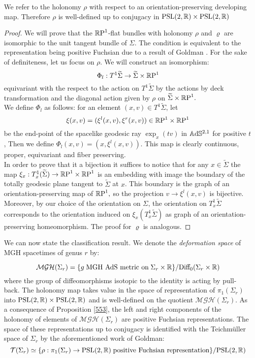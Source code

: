 \begin{observation}
We refer to the holonomy $\rho$ with respect to an orientation-preserving developing map. Therefore $\rho$ is well-defined up to conjugacy in $\text{PSL}(2,\R)\times\text{PSL}(2,\R)$
\end{observation}
\begin{proof}
    We will prove that the $\S$-flat bundles with holonomy $\rho$ and $\varrho$ are isomorphic to the unit tangent bundle of $\Sigma.$ The condition is equivalent to the representation being positive Fuchsian due to a result of Goldman \cite{goldman1980discontinuous}. For the sake of definiteness, let us focus on $\rho$. We will construct an isomorphism: 
    \[
        \Phi_l:T^1\widetilde{\Sigma}\to \widetilde{\Sigma}\times\S
    \]
    equivariant with the respect to the action on $T^1\widetilde{\Sigma}$ by the actions by deck transformation and the diagonal action given by $\rho$ on $\widetilde{\Sigma}\times\S.$ \\
    We define $\Phi_l$ as follows: for an element $(x,v)\in T^1\widetilde{\Sigma}$, let 
    \[
        \xi(x,v)=(\xi^l(x,v),\xi^r(x,v))\in \T
    \]
    be the end-point of the spacelike geodesic ray $\exp_x(tv)$ in $\A^{2,1}$ for positive $t$, Then we define $\Phi_l(x,v)=(x,\xi^l(x,v)).$ This map is clearly continuous, proper, equivariant and fiber preserving. \\
    In order to prove that it a bijection it suffices to notice that for any $x\in\widetilde{\Sigma}$ the map $\xi_x:T_x^1(\widetilde{\Sigma})\to\T$ is an embedding with image the boundary of the totally geodesic plane tangent to $\widetilde{\Sigma}$ at $x$. This boundary is the graph of an orientation-preserving map of $\S,$ so the projection $v\to\xi^l(x,v)$ is bijective. Moreover, by our choice of the orientation on $\Sigma$, the orientation on $T_x^1\widetilde{\Sigma}$ corresponds to the orientation induced on $\xi_x(T^1_x\widetilde{\Sigma})$ as graph of an orientation-preserving homeomorphism. The proof for $\varrho$ is analogous.
\end{proof}


We can now state the classification result. We denote the \textit{deformation space} of MGH spacetimes of genus $r$ by:

\[
    \mathcal{MGH}(\Sigma_r)=\{g\;\text{MGH AdS metric on}\;\Sigma_r\times\R\}/\text{Diff}_0(\Sigma_r\times\R)
\]
where the group of diffeomorphisms isotopic to the identity is acting by pull-back. The holonomy map takes value in the space of representation of $\pi_1(\Sigma_r)$ into $\PSL\times\PSL$ and is well-defined on the quotient $ \mathcal{MGH}(\Sigma_r).$
As a consequence of Proposition \ref{553}, the left and right components of the holonomy of elements of $ \mathcal{MGH}(\Sigma_r)$ are positive Fuchsian representations. The space of these representations up to conjugacy is identified with the Teichm\"uller space of $\Sigma_r$ by the aforementioned work of Goldman:
\[
    \mathcal{T}(\Sigma_r)\simeq\{\rho:\pi_1(\Sigma_r)\to\PSL\;\text{positive Fuchsian representation}\}/\PSL
\]

